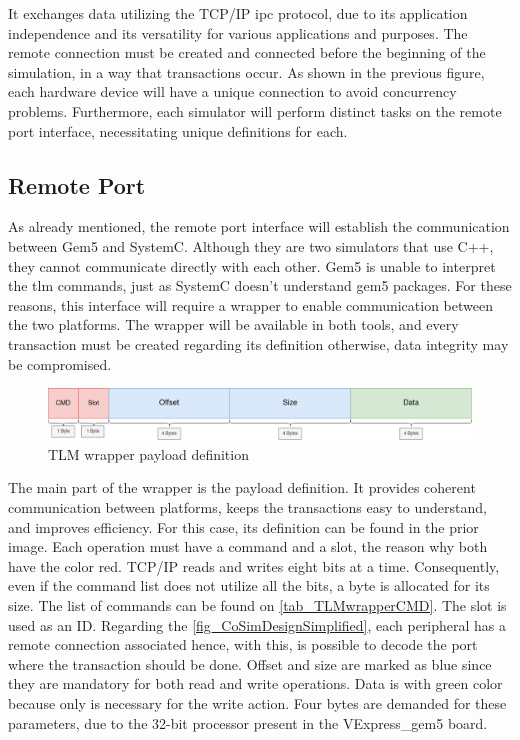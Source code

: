 It exchanges data utilizing the TCP/IP \gls{ipc} protocol, due to its application independence and its versatility for various applications 
and purposes. The remote connection must be created and connected before the beginning of the simulation, in a way that transactions occur. 
As shown in the previous figure, each hardware device will have a unique connection to avoid concurrency problems. Furthermore, each simulator 
will perform distinct tasks on the remote port interface, necessitating unique definitions for each.

\subsection{Remote Port} 
\label{subsec::TLMwrapper}

As already mentioned, the remote port interface will establish the communication between Gem5 and SystemC.
Although they are two simulators that use C++, they cannot communicate directly with each other. Gem5 is unable to 
interpret the \gls{tlm} commands, just as SystemC doesn't understand gem5 packages. For these reasons,
this interface will require a wrapper to enable communication between the two platforms. 
The wrapper will be available in both tools, and every transaction must be created regarding its definition otherwise, 
data integrity may be compromised. 

\begin{figure}[H]
	\centering
 	\includegraphics[width=0.8\linewidth]{Images/TLM_Wrapper_Payload.png} 
 	\caption{TLM wrapper payload definition}
\end{figure}


The main part of the wrapper is the payload definition. It provides coherent communication between platforms, keeps the transactions
easy to understand, and improves efficiency. For this case, its definition can be found in the prior image. Each operation must 
have a command and a slot, the reason why both have the color red. TCP/IP reads and writes eight bits at a time. Consequently, even if 
the command list does not utilize all the bits, a byte is allocated for its size. The list of commands can be found on
\autoref{tab_TLMwrapperCMD}. The slot is used as an ID. Regarding the \autoref{fig_CoSimDesignSimplified}, each peripheral has a remote 
connection associated hence, with this, is possible to decode the port where the transaction should be done. Offset and size are 
marked as blue since they are mandatory for both read and write operations. 
Data is with green color because only is necessary for the write action. Four bytes are demanded for these parameters, due to the 32-bit
processor present in the VExpress\_gem5 board.

